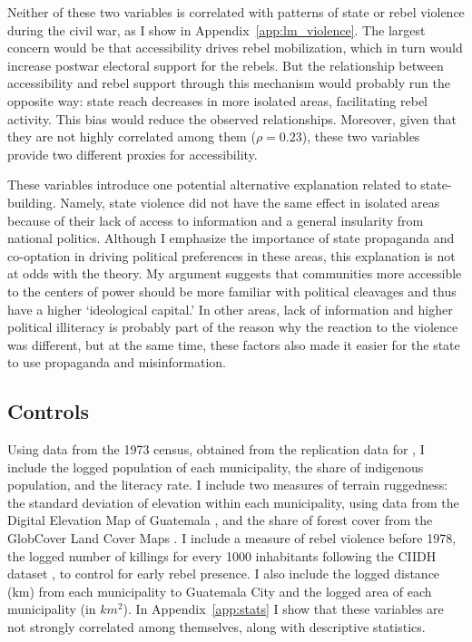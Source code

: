 \documentclass[12pt, notitlepage]{article}
\begin{document}
Neither of these two variables is correlated with patterns of state or rebel violence during the civil war, as I show in Appendix~\ref{app:lm_violence}.
The largest concern would be that accessibility drives rebel mobilization, which in turn would increase postwar electoral support for the rebels.
But the relationship between accessibility and rebel support through this mechanism would probably run the opposite way: state reach decreases in more isolated areas, facilitating rebel activity.
This bias would reduce the observed relationships.
Moreover, given that they are not highly correlated among them ($\rho = 0.23$), these two variables provide two different proxies for accessibility.

These variables introduce one potential alternative explanation related to state-building.
Namely, state violence did not have the same effect in isolated areas because of their lack of access to information and a general insularity from national politics.
Although I emphasize the importance of state propaganda and co-optation in driving political preferences in these areas, this explanation is not at odds with the theory.
My argument suggests that communities more accessible to the centers of power should be more familiar with political cleavages and thus have a higher `ideological capital.'
In other areas, lack of information and higher political illiteracy is probably part of the reason why the reaction to the violence was different, but at the same time, these factors also made it easier for the state to use propaganda and misinformation.

\subsection*{Controls}

Using data from the 1973 census, obtained from the replication data for \citet{Sullivan:2012aa}, I include the logged population of each municipality, the share of indigenous population, and the literacy rate.
I include two measures of terrain ruggedness: the standard deviation of elevation within each municipality, using data from the Digital Elevation Map of Guatemala \citep{Mapzen:2018aa}, and the share of forest cover from the GlobCover Land Cover Maps \citep{Arino:2012aa}.
I include a measure of rebel violence before 1978, the logged number of killings for every 1000 inhabitants following the CIIDH dataset \citep{Ball:1999aa}, to control for early rebel presence.
I also include the logged distance (km) from each municipality to Guatemala City and the logged area of each municipality (in $km^2$).
In Appendix~\ref{app:stats} I show that these variables are not strongly correlated among themselves, along with descriptive statistics.
\end{document}
